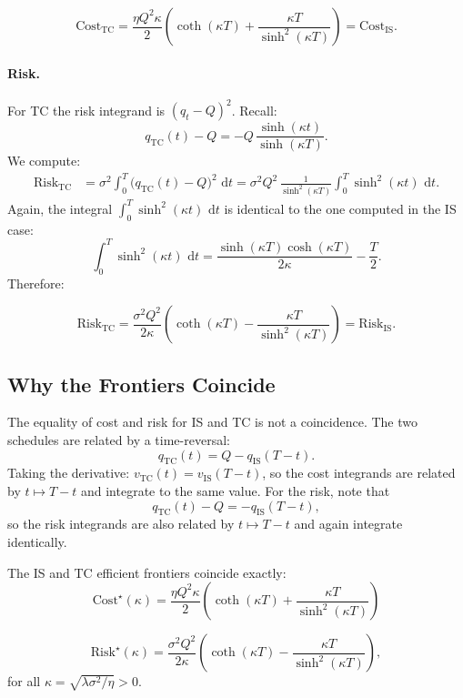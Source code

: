 \documentclass[12pt, a4paper]{article}
\newcommand{\dd}{\,\mathrm{d}}
\newcommand{\kap}{\kappa}
\begin{document}
\begin{resultbox}
\[
  \mathrm{Cost}_{\mathrm{TC}}
  = \frac{\eta Q^2 \kap}{2}
    \left(\coth(\kap T) + \frac{\kap T}{\sinh^2(\kap T)}\right)
  = \mathrm{Cost}_{\mathrm{IS}}.
\]
\end{resultbox}

\paragraph{Risk.}
For TC the risk integrand is $(q_t - Q)^2$. Recall:
\[
  q_{\mathrm{TC}}(t) - Q = -Q\,\frac{\sinh(\kap t)}{\sinh(\kap T)}.
\]
We compute:
\begin{align*}
  \mathrm{Risk}_{\mathrm{TC}}
  &= \sigma^2\int_0^T \bigl(q_{\mathrm{TC}}(t) - Q\bigr)^2\,\dd t
   = \sigma^2 Q^2\,\frac{1}{\sinh^2(\kap T)}\int_0^T \sinh^2(\kap t)\,\dd t.
\end{align*}
Again, the integral $\int_0^T \sinh^2(\kap t)\,\dd t$ is identical to the one computed
in the IS case:
\[
  \int_0^T \sinh^2(\kap t)\,\dd t
  = \frac{\sinh(\kap T)\cosh(\kap T)}{2\kap} - \frac{T}{2}.
\]
Therefore:

\begin{resultbox}
\[
  \mathrm{Risk}_{\mathrm{TC}}
  = \frac{\sigma^2 Q^2}{2\kap}
    \left(\coth(\kap T) - \frac{\kap T}{\sinh^2(\kap T)}\right)
  = \mathrm{Risk}_{\mathrm{IS}}.
\]
\end{resultbox}

\subsection{Why the Frontiers Coincide}

The equality of cost and risk for IS and TC is not a coincidence.
The two schedules are related by a time-reversal:
\[
  q_{\mathrm{TC}}(t) = Q - q_{\mathrm{IS}}(T - t).
\]
Taking the derivative: $v_{\mathrm{TC}}(t) = v_{\mathrm{IS}}(T-t)$,
so the cost integrands are related by $t \mapsto T - t$ and integrate to the same value.
For the risk, note that
\[
  q_{\mathrm{TC}}(t) - Q = -q_{\mathrm{IS}}(T-t),
\]
so the risk integrands are also related by $t \mapsto T - t$ and again integrate identically.

\begin{resultbox}
The IS and TC efficient frontiers coincide exactly:
\[
  \mathrm{Cost}^\star(\kap) = \frac{\eta Q^2 \kap}{2}
    \left(\coth(\kap T) + \frac{\kap T}{\sinh^2(\kap T)}\right)
    \]
  
\[
  \mathrm{Risk}^\star(\kap) = \frac{\sigma^2 Q^2}{2\kap}
    \left(\coth(\kap T) - \frac{\kap T}{\sinh^2(\kap T)}\right),
\]
for all $\kap = \sqrt{\lambda\sigma^2/\eta} > 0$.
\end{resultbox}
\end{document}
